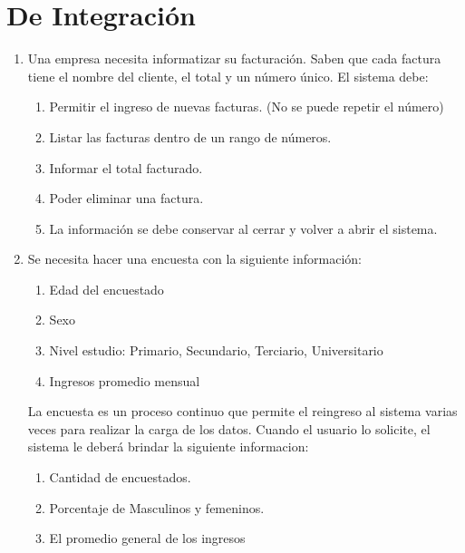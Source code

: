 \chapter{De Integración}

 \begin{enumerate}[resume]

  \item Una empresa necesita informatizar su facturaci\'on. Saben que cada factura tiene el nombre del cliente, el total y un n\'umero \'unico. El sistema debe:
  
  \begin{enumerate}
	  \item Permitir el ingreso de nuevas facturas. (No se puede repetir el n\'umero)
	  \item Listar las facturas dentro de un rango de n\'umeros.
	  \item Informar el total facturado.
	  \item Poder eliminar una factura.
	  \item La informaci\'on se debe conservar al cerrar y volver a abrir el sistema.
  \end{enumerate}
  
  \item Se necesita hacer una encuesta con la siguiente información:
  \begin{enumerate}  
      \item Edad del encuestado
      \item Sexo
      \item Nivel estudio: Primario, Secundario, Terciario, Universitario
      \item Ingresos promedio mensual
  \end{enumerate}
  
La encuesta es un proceso continuo que permite el reingreso al sistema varias veces para realizar la carga de los datos.
Cuando el usuario lo solicite, el sistema le deberá brindar la siguiente informacion:
	
  \begin{enumerate}
     \item Cantidad de encuestados.
     \item Porcentaje de Masculinos y femeninos.
     \item El promedio general de los ingresos
  \end{enumerate}






\end{enumerate}

